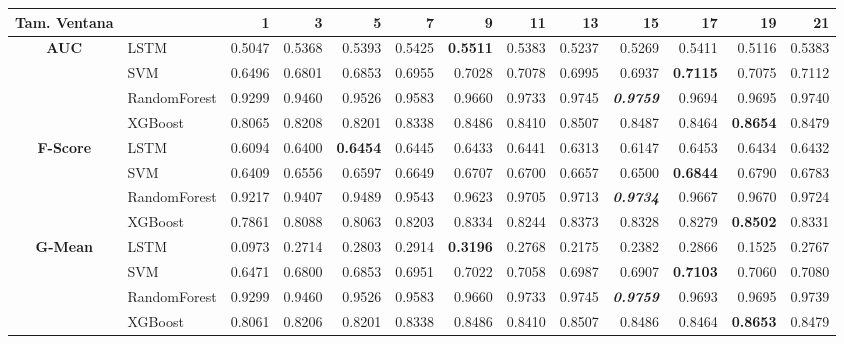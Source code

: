 \begin{table}[H]
	\centering
	\begin{adjustbox}{max width=14cm}
		\begin{tabular}{|c|l|r|r|r|r|r|r|r|r|r|r|r|}
			\hline
			\textbf{Tam. Ventana}&         &      1  &      3  &      5  &      7  &      9  &      11 &      13 &      15 &      17 &      19 &      21 \\
			\hline
			\textbf{AUC}&  LSTM &  0.5047 &  0.5368 &  0.5393 &  0.5425 & \textbf{  0.5511 } &  0.5383 &  0.5237 &  0.5269 &  0.5411 &  0.5116 &  0.5383 \\
			&  SVM &  0.6496 &  0.6801 &  0.6853 &  0.6955 &  0.7028 &  0.7078 &  0.6995 &  0.6937 & \textbf{  0.7115 } &  0.7075 &  0.7112 \\
			&  RandomForest &  0.9299 &  0.9460 &  0.9526 &  0.9583 &  0.9660 &  0.9733 &  0.9745 & \textit{ \textbf{  0.9759 } } &  0.9694 &  0.9695 &  0.9740 \\
			&  XGBoost &  0.8065 &  0.8208 &  0.8201 &  0.8338 &  0.8486 &  0.8410 &  0.8507 &  0.8487 &  0.8464 & \textbf{  0.8654 } &  0.8479 \\
			\hline
			\textbf{F-Score} &  LSTM &  0.6094 &  0.6400 & \textbf{  0.6454 } &  0.6445 &  0.6433 &  0.6441 &  0.6313 &  0.6147 &  0.6453 &  0.6434 &  0.6432 \\
			&  SVM &  0.6409 &  0.6556 &  0.6597 &  0.6649 &  0.6707 &  0.6700 &  0.6657 &  0.6500 & \textbf{  0.6844 } &  0.6790 &  0.6783 \\
			&  RandomForest &  0.9217 &  0.9407 &  0.9489 &  0.9543 &  0.9623 &  0.9705 &  0.9713 & \textit{ \textbf{  0.9734 } } &  0.9667 &  0.9670 &  0.9724 \\
			&  XGBoost &  0.7861 &  0.8088 &  0.8063 &  0.8203 &  0.8334 &  0.8244 &  0.8373 &  0.8328 &  0.8279 & \textbf{  0.8502 } &  0.8331 \\			
			\hline
			\textbf{G-Mean} &  LSTM &  0.0973 &  0.2714 &  0.2803 &  0.2914 & \textbf{  0.3196 } &  0.2768 &  0.2175 &  0.2382 &  0.2866 &  0.1525 &  0.2767 \\
			&  SVM &  0.6471 &  0.6800 &  0.6853 &  0.6951 &  0.7022 &  0.7058 &  0.6987 &  0.6907 & \textbf{  0.7103 } &  0.7060 &  0.7080 \\
			&  RandomForest &  0.9299 &  0.9460 &  0.9526 &  0.9583 &  0.9660 &  0.9733 &  0.9745 & \textit{ \textbf{  0.9759 } } &  0.9693 &  0.9695 &  0.9739 \\
			&  XGBoost &  0.8061 &  0.8206 &  0.8201 &  0.8338 &  0.8486 &  0.8410 &  0.8507 &  0.8486 &  0.8464 & \textbf{  0.8653 } &  0.8479 \\			

\end{tabular}
\end{adjustbox}
\end{table}

